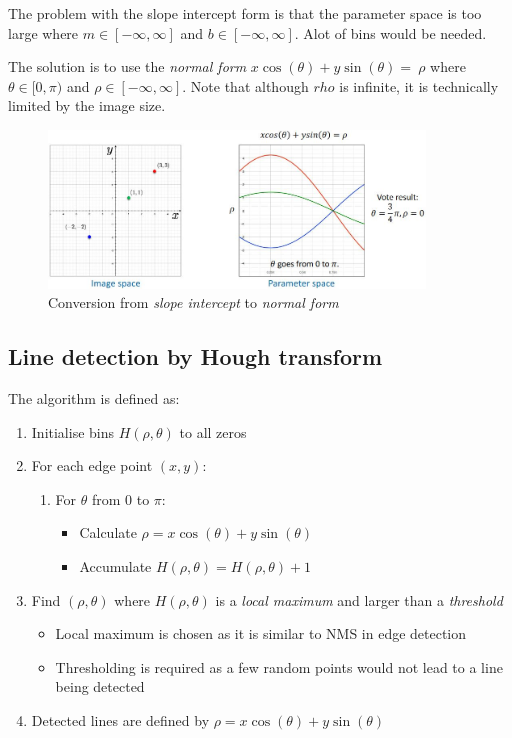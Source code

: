 \documentclass{report}
\begin{document}
The problem with the slope intercept form is that the parameter space is too
large where $m \in [-\infty, \infty]$ and $b \in [-\infty, \infty]$. Alot of
bins would be needed.

The solution is to use the \textit{normal form} $x\cos(\theta) + y\sin(\theta) =\
\rho$ where $\theta \in [0, \pi)$ and $\rho \in [-\infty, \infty]$. Note that
although $rho$ is infinite, it is technically limited by the image size.   
\begin{figure}[h]
    \centering
    \includegraphics[width=10cm]{Normal Hough.JPG}
    \caption{Conversion from \textit{slope intercept} to \textit{normal form}}
\end{figure}

\subsection{Line detection by Hough transform}

The algorithm is defined as:
\begin{enumerate}
    \item Initialise bins $H(\rho, \theta)$ to all zeros 
    \item For each edge point $(x,y)$:
    \begin{enumerate}
        \item For $\theta$ from $0$ to $\pi$: 
        \begin{itemize}
            \item Calculate $\rho = x\cos(\theta) + y\sin(\theta)$
            \item Accumulate $H(\rho, \theta) = H(\rho, \theta) + 1$
        \end{itemize}
    \end{enumerate}
    \item Find $(\rho, \theta)$ where $H(\rho, \theta)$ is a \textit{local maximum} and
    larger than a \textit{threshold} 
    \begin{itemize}
        \item Local maximum is chosen as it is similar to NMS in edge detection 
        \item Thresholding is required as a few random points would not lead to
        a line being detected 
    \end{itemize}
    \item Detected lines are defined by $\rho = x\cos(\theta) + y\sin(\theta)$
\end{enumerate}
\end{document}
